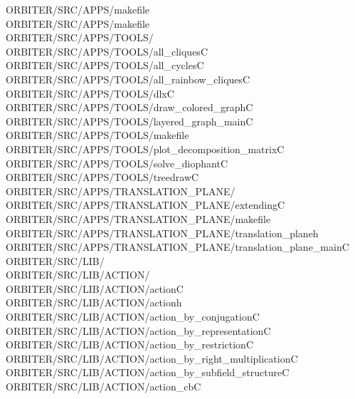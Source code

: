 \begin{tabbing}
ORBITER/SRC/APPS/makefile\\[0pt]
ORBITER/SRC/APPS/makefile\\[0pt]
ORBITER/SRC/APPS/TOOLS/\\[0pt]
ORBITER/SRC/APPS/TOOLS/all\_cliquesC\\[0pt]
ORBITER/SRC/APPS/TOOLS/all\_cyclesC\\[0pt]
ORBITER/SRC/APPS/TOOLS/all\_rainbow\_cliquesC\\[0pt]
ORBITER/SRC/APPS/TOOLS/dlxC\\[0pt]
ORBITER/SRC/APPS/TOOLS/draw\_colored\_graphC\\[0pt]
ORBITER/SRC/APPS/TOOLS/layered\_graph\_mainC\\[0pt]
ORBITER/SRC/APPS/TOOLS/makefile\\[0pt]
ORBITER/SRC/APPS/TOOLS/plot\_decomposition\_matrixC\\[0pt]
ORBITER/SRC/APPS/TOOLS/solve\_diophantC\\[0pt]
ORBITER/SRC/APPS/TOOLS/treedrawC\\[0pt]
ORBITER/SRC/APPS/TRANSLATION\_PLANE/\\[0pt]
ORBITER/SRC/APPS/TRANSLATION\_PLANE/extendingC\\[0pt]
ORBITER/SRC/APPS/TRANSLATION\_PLANE/makefile\\[0pt]
ORBITER/SRC/APPS/TRANSLATION\_PLANE/translation\_planeh\\[0pt]
ORBITER/SRC/APPS/TRANSLATION\_PLANE/translation\_plane\_mainC\\[0pt]
ORBITER/SRC/LIB/\\[0pt]
ORBITER/SRC/LIB/ACTION/\\[0pt]
ORBITER/SRC/LIB/ACTION/actionC\\[0pt]
ORBITER/SRC/LIB/ACTION/actionh\\[0pt]
ORBITER/SRC/LIB/ACTION/action\_by\_conjugationC\\[0pt]
ORBITER/SRC/LIB/ACTION/action\_by\_representationC\\[0pt]
ORBITER/SRC/LIB/ACTION/action\_by\_restrictionC\\[0pt]
ORBITER/SRC/LIB/ACTION/action\_by\_right\_multiplicationC\\[0pt]
ORBITER/SRC/LIB/ACTION/action\_by\_subfield\_structureC\\[0pt]
ORBITER/SRC/LIB/ACTION/action\_cbC\\[0pt]

\end{tabbing}
